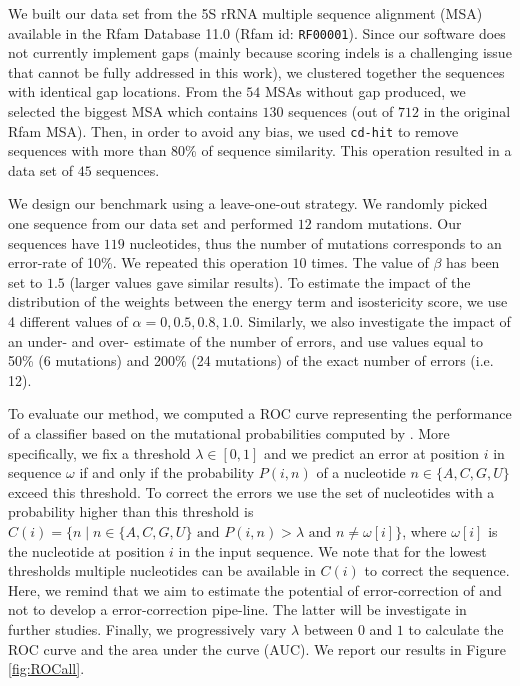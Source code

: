 We built our data set from the 5S rRNA multiple sequence alignment (MSA) available in the Rfam Database 11.0 (Rfam id: \texttt{RF00001}).
Since our software does not currently implement gaps (mainly because scoring indels is a challenging issue that cannot be fully addressed
in this work),  we clustered together the sequences with identical gap locations. From the $54$ MSAs without gap produced, we selected the
biggest MSA  which contains $130$ sequences (out of $712$ in the original Rfam MSA). Then, in order to avoid any bias, we used \texttt{cd-hit}
\cite{Li:2006fk} to remove sequences with more than 80\% of sequence similarity. This operation resulted in a data set of $45$ sequences. 

We design our benchmark using a leave-one-out strategy. We randomly picked one sequence from our data set and performed $12$ random
mutations. Our sequences have $119$ nucleotides, thus the number of mutations corresponds to an error-rate of 10\%. We repeated this operation 
$10$ times. The value of $\beta$ has been set to $1.5$ (larger values gave similar results). To estimate the impact of the distribution of the weights
between the energy term and isostericity  score, we use 4 different values of $\alpha = {0, 0.5, 0.8, 1.0}$. Similarly, we also investigate the impact of 
an under- and over- estimate of the number of errors, and use values equal to 50\% (6 mutations) and 200\% (24 mutations) of the exact number of
errors (i.e. 12).

To evaluate our method, we computed a ROC curve representing the performance of a classifier based on the mutational probabilities computed
by \RNApyro. More specifically, we fix a threshold $\lambda \in [0,1]$ and we predict an error at position $i$ in sequence $\omega$ if and only if the
probability $P(i,n)$ of a nucleotide $n \in \{ A,C,G,U \}$ exceed this threshold. To correct the errors we use the set of nucleotides with a probability
higher than this threshold is  $C(i) = \{ n \; | \;  n \in \{ A,C,G,U \} \mbox{ and } P(i,n) > \lambda \mbox{ and }  n \neq \omega[i] \}$, where $\omega[i]$ is
the nucleotide at position $i$ in the input sequence. We note that for the lowest thresholds multiple nucleotides can be available in $C(i)$ to correct
the sequence. Here, we remind that we aim to estimate the potential of error-correction of \RNApyro and not to develop a error-correction pipe-line. 
The latter will be investigate in further studies. Finally, we progressively vary $\lambda$ between $0$ and $1$ to calculate the ROC curve and the area
under the curve (AUC). We report our results in Figure \ref{fig:ROCall}. 


